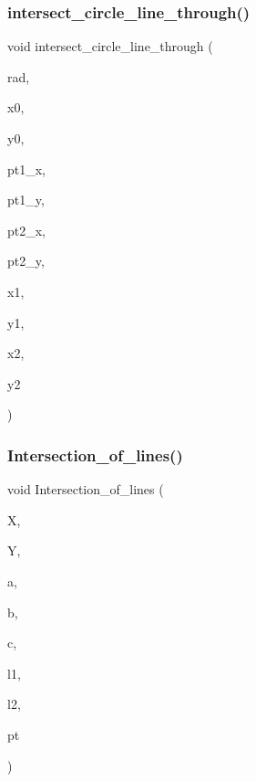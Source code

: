 \mbox{\label{draw_8_c_aff0422122d76e944bc98278016b3a549}} 
\subsubsection{\texorpdfstring{intersect\+\_\+circle\+\_\+line\+\_\+through()}{intersect\_circle\_line\_through()}}
{\footnotesize\ttfamily void intersect\+\_\+circle\+\_\+line\+\_\+through (\begin{DoxyParamCaption}\item[{double}]{rad,  }\item[{double}]{x0,  }\item[{double}]{y0,  }\item[{double}]{pt1\+\_\+x,  }\item[{double}]{pt1\+\_\+y,  }\item[{double}]{pt2\+\_\+x,  }\item[{double}]{pt2\+\_\+y,  }\item[{double \&}]{x1,  }\item[{double \&}]{y1,  }\item[{double \&}]{x2,  }\item[{double \&}]{y2 }\end{DoxyParamCaption})}

\mbox{\label{draw_8_c_a3d6993d94efaf05c00155047dd36d35b}} 
\subsubsection{\texorpdfstring{Intersection\+\_\+of\+\_\+lines()}{Intersection\_of\_lines()}}
{\footnotesize\ttfamily void Intersection\+\_\+of\+\_\+lines (\begin{DoxyParamCaption}\item[{double $\ast$}]{X,  }\item[{double $\ast$}]{Y,  }\item[{double $\ast$}]{a,  }\item[{double $\ast$}]{b,  }\item[{double $\ast$}]{c,  }\item[{\mbox{\hyperlink{galois_8h_a09fddde158a3a20bd2dcadb609de11dc}{I\+NT}}}]{l1,  }\item[{\mbox{\hyperlink{galois_8h_a09fddde158a3a20bd2dcadb609de11dc}{I\+NT}}}]{l2,  }\item[{\mbox{\hyperlink{galois_8h_a09fddde158a3a20bd2dcadb609de11dc}{I\+NT}}}]{pt }\end{DoxyParamCaption})}

